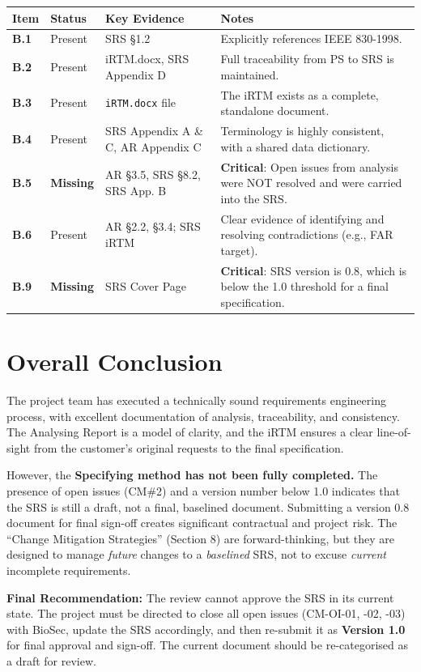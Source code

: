 \documentclass[11pt,a4paper]{article}
\begin{document}
\begin{longtable}{|L{0.12\textwidth}|L{0.12\textwidth}|L{0.35\textwidth}|L{0.35\textwidth}|}
\hline
{}
\textbf{Item} & \textbf{Status} & \textbf{Key Evidence} & \textbf{Notes} \\\hline
\textbf{B.1} & Present & SRS \S 1.2 & Explicitly references IEEE 830-1998. \\
\hline
\textbf{B.2} & Present & iRTM.docx, SRS Appendix D & Full traceability from PS to SRS is maintained. \\
\hline
\textbf{B.3} & Present & \texttt{iRTM.docx} file & The iRTM exists as a complete, standalone document. \\
\hline
\textbf{B.4} & Present & SRS Appendix A \& C, AR Appendix C & Terminology is highly consistent, with a shared data dictionary. \\
\hline
\textbf{B.5} & \textbf{Missing} & AR \S 3.5, SRS \S 8.2, SRS App. B & \textbf{Critical}: Open issues from analysis were NOT resolved and were carried into the SRS. \\
\hline
\textbf{B.6} & Present & AR \S 2.2, \S 3.4; SRS iRTM & Clear evidence of identifying and resolving contradictions (e.g., FAR target). \\
\hline
\textbf{B.9} & \textbf{Missing} & SRS Cover Page & \textbf{Critical}: SRS version is 0.8, which is below the 1.0 threshold for a final specification. \\
\hline
\end{longtable}

\section{Overall Conclusion}

The project team has executed a technically sound requirements engineering process, with excellent documentation of analysis, traceability, and consistency. The Analysing Report is a model of clarity, and the iRTM ensures a clear line-of-sight from the customer's original requests to the final specification.

However, the \textbf{Specifying method has not been fully completed.} The presence of open issues (CM\#2) and a version number below 1.0 indicates that the SRS is still a draft, not a final, baselined document. Submitting a version 0.8 document for final sign-off creates significant contractual and project risk. The ``Change Mitigation Strategies'' (Section 8) are forward-thinking, but they are designed to manage \textit{future} changes to a \textit{baselined} SRS, not to excuse \textit{current} incomplete requirements.

\textbf{Final Recommendation:} The review cannot approve the SRS in its current state. The project must be directed to close all open issues (CM-OI-01, -02, -03) with BioSec, update the SRS accordingly, and then re-submit it as \textbf{Version 1.0} for final approval and sign-off. The current document should be re-categorised as a draft for review.
\end{document}
